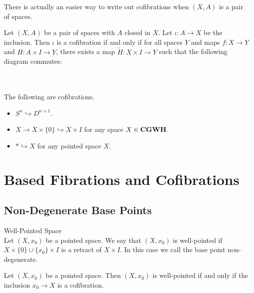 \documentclass[a4paper]{article}
\begin{document}
There is actually an easier way to write out cofibrations when $(X,A)$ is a pair of spaces. 

\begin{lmm}{}{} Let $(X,A)$ be a pair of spaces with $A$ closed in $X$. Let $\iota:A\to X$ be the inclusion. Then $\iota$ is a cofibration if and only if for all spaces $Y$ and maps $f:X\to Y$ and $H:A\times I\to Y$, there exists a map $\tilde{H}:X\times I\to Y$ such that the following diagram commutes: \\
\\
\end{lmm}

\begin{eg}{}{}\\
The following are cofibrations. 
\begin{itemize}
\item $S^n\hookrightarrow D^{n+1}$. 
\item $X\to X\times\{0\}\hookrightarrow X\times I$ for any space $X\in\bold{CGWH}$. 
\item $\ast\hookrightarrow X$ for any pointed space $X$. 
\end{itemize}
\end{eg}

\pagebreak
\section{Based Fibrations and Cofibrations}
\subsection{Non-Degenerate Base Points}
\begin{defn}{Well-Pointed Space}{}\\
Let $(X,x_0)$ be a pointed space. We say that $(X,x_0)$ is well-pointed if $X\times\{0\}\cup\{x_0\}\times I$ is a retract of $X\times I$. In this case we call the base point non-degenerate. 
\end{defn}

\begin{prp}{}{} Let $(X,x_0)$ be a pointed space. Then $(X,x_0)$ is well-pointed if and only if the inclusion $x_0\to X$ is a cofibration. 
\end{prp}
\end{document}
